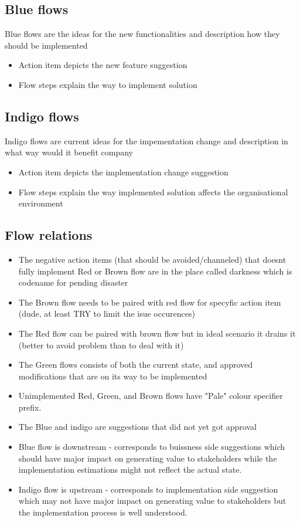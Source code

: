 \subsection{Blue flows}\label{philo:blue:flow}
Blue flows are the ideas for the new functionalities and description how they should be implemented
\begin{itemize}
  \item Action item depicts the new feature suggestion 
  \item Flow steps explain the way to implement solution
\end{itemize}
\subsection{Indigo flows}\label{philo:indigo:flow}
Indigo flows are current ideas for the impementation change and description in what way would it benefit company
\begin{itemize}
  \item Action item depicts the implementation change suggestion 
  \item Flow steps explain the way implemented solution affects the organisational environment
\end{itemize}
\subsection{Flow relations}
\begin{itemize}
  \item The negative action items (that should be avoided/channeled) that doesnt fully implement 
  Red or Brown flow are in the place called darkness which is codename for pending disaster
  \item The Brown flow needs to be paired with red flow for specyfic action item (dude, at least TRY to limit the isue occurences)
  \item The Red flow can be paired with brown flow but in ideal scenario it drains it (better to avoid problem than to deal with it)
  \item The Green flows consists of both the current state, and approved modifications that are on its way to be implemented
  \item Unimplemented Red, Green, and Brown flows have "Pale" colour specifier prefix.
  \item The Blue and indigo are suggestions that did not yet got approval
  \item Blue flow is downstream - corresponds to buissness side suggestions which should have major impact on generating value to stakeholders while the implementation estimations might not reflect the actual state.
  \item Indigo flow is upstream - corresponds to implementation side suggestion which may not have major impact on generating value to stakeholders but the implementation process is well understood.
\end{itemize}
\newpage
